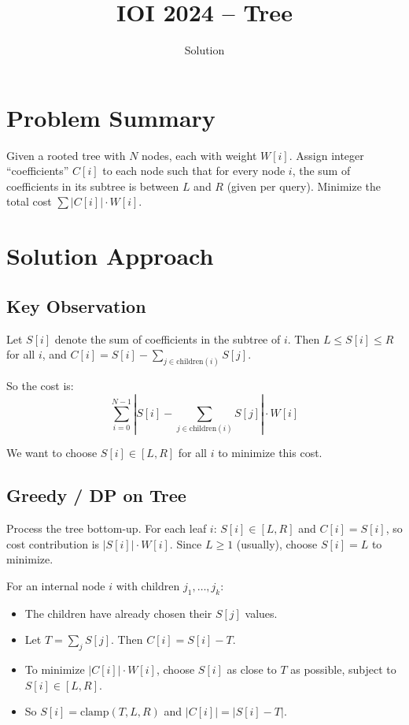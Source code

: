 \documentclass[11pt,a4paper]{article}
\title{IOI 2024 -- Tree}
\author{Solution}
\date{}
\begin{document}
\maketitle

\section{Problem Summary}
Given a rooted tree with $N$ nodes, each with weight $W[i]$. Assign integer ``coefficients'' $C[i]$ to each node such that for every node $i$, the sum of coefficients in its subtree is between $L$ and $R$ (given per query). Minimize the total cost $\sum |C[i]| \cdot W[i]$.

\section{Solution Approach}

\subsection{Key Observation}
Let $S[i]$ denote the sum of coefficients in the subtree of $i$. Then $L \le S[i] \le R$ for all $i$, and $C[i] = S[i] - \sum_{j \in \text{children}(i)} S[j]$.

So the cost is:
\[\sum_{i=0}^{N-1} |S[i] - \sum_{j \in \text{children}(i)} S[j]| \cdot W[i]\]

We want to choose $S[i] \in [L, R]$ for all $i$ to minimize this cost.

\subsection{Greedy / DP on Tree}
Process the tree bottom-up. For each leaf $i$: $S[i] \in [L, R]$ and $C[i] = S[i]$, so cost contribution is $|S[i]| \cdot W[i]$. Since $L \ge 1$ (usually), choose $S[i] = L$ to minimize.

For an internal node $i$ with children $j_1, \ldots, j_k$:
\begin{itemize}
  \item The children have already chosen their $S[j]$ values.
  \item Let $T = \sum_j S[j]$. Then $C[i] = S[i] - T$.
  \item To minimize $|C[i]| \cdot W[i]$, choose $S[i]$ as close to $T$ as possible, subject to $S[i] \in [L, R]$.
  \item So $S[i] = \text{clamp}(T, L, R)$ and $|C[i]| = |S[i] - T|$.
\end{itemize}
\end{document}
